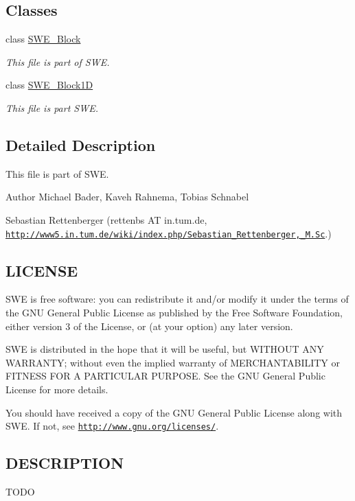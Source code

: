 \subsection*{Classes}
\begin{DoxyCompactItemize}
\item 
class \hyperlink{classSWE__Block}{S\+W\+E\+\_\+\+Block}
\begin{DoxyCompactList}\small\item\em This file is part of S\+WE. \end{DoxyCompactList}\item 
class \hyperlink{structSWE__Block1D}{S\+W\+E\+\_\+\+Block1D}
\begin{DoxyCompactList}\small\item\em This file is part S\+WE. \end{DoxyCompactList}\end{DoxyCompactItemize}


\subsection{Detailed Description}
This file is part of S\+WE.

\begin{DoxyAuthor}{Author}
Michael Bader, Kaveh Rahnema, Tobias Schnabel 

Sebastian Rettenberger (rettenbs AT in.\+tum.\+de, \href{http://www5.in.tum.de/wiki/index.php/Sebastian_Rettenberger,_M.Sc}{\tt http\+://www5.\+in.\+tum.\+de/wiki/index.\+php/\+Sebastian\+\_\+\+Rettenberger,\+\_\+\+M.\+Sc}.)
\end{DoxyAuthor}
\hypertarget{help_8hh_LICENSE}{}\subsection{L\+I\+C\+E\+N\+SE}\label{help_8hh_LICENSE}
S\+WE is free software\+: you can redistribute it and/or modify it under the terms of the G\+NU General Public License as published by the Free Software Foundation, either version 3 of the License, or (at your option) any later version.

S\+WE is distributed in the hope that it will be useful, but W\+I\+T\+H\+O\+UT A\+NY W\+A\+R\+R\+A\+N\+TY; without even the implied warranty of M\+E\+R\+C\+H\+A\+N\+T\+A\+B\+I\+L\+I\+TY or F\+I\+T\+N\+E\+SS F\+OR A P\+A\+R\+T\+I\+C\+U\+L\+AR P\+U\+R\+P\+O\+SE. See the G\+NU General Public License for more details.

You should have received a copy of the G\+NU General Public License along with S\+WE. If not, see \href{http://www.gnu.org/licenses/}{\tt http\+://www.\+gnu.\+org/licenses/}.\hypertarget{help_8hh_DESCRIPTION}{}\subsection{D\+E\+S\+C\+R\+I\+P\+T\+I\+ON}\label{help_8hh_DESCRIPTION}
T\+O\+DO 